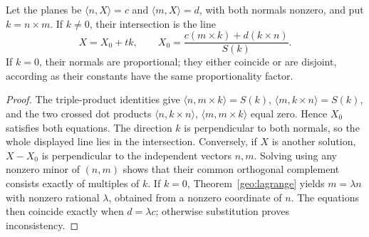 \begin{theorem}
\label{geo:two-planes}
Let the planes be $\langle n,X\rangle=c$ and $\langle m,X\rangle=d$, with
both normals nonzero, and put $k=n\times m$.
If $k\ne0$, their intersection is the line
\[
 X=X_0+tk,\qquad
 X_0=\frac{c(m\times k)+d(k\times n)}{S(k)}.
\]
If $k=0$, their normals are proportional; they either coincide or are
disjoint, according as their constants have the same proportionality factor.
\end{theorem}
\begin{proof}
The triple-product identities give
$\langle n,m\times k\rangle=S(k)$,
$\langle m,k\times n\rangle=S(k)$, and the two crossed dot products
$\langle n,k\times n\rangle$, $\langle m,m\times k\rangle$ equal zero.
Hence $X_0$ satisfies both equations. The direction $k$ is perpendicular
to both normals, so the whole displayed line lies in the intersection.
Conversely, if $X$ is another solution, $X-X_0$ is perpendicular to the
independent vectors $n,m$. Solving using any nonzero minor of $(n,m)$
shows that their common orthogonal complement consists exactly of multiples
of $k$. If $k=0$, Theorem~\ref{geo:lagrange} yields $m=\lambda n$ with
nonzero rational $\lambda$, obtained from a nonzero coordinate of $n$.
The equations then coincide exactly when $d=\lambda c$; otherwise
substitution proves inconsistency.
\end{proof}

